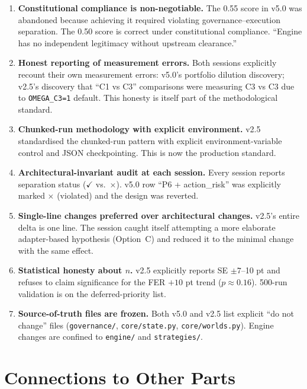\begin{enumerate}
\item \textbf{Constitutional compliance is non-negotiable.}
The 0.55 score in v5.0 was abandoned because achieving it required
violating governance--execution separation. The 0.50 score is
correct under constitutional compliance. ``Engine has no independent
legitimacy without upstream clearance.''

\item \textbf{Honest reporting of measurement errors.}
Both sessions explicitly recount their own measurement errors:
v5.0's portfolio dilution discovery; v2.5's discovery that ``C1 vs
C3'' comparisons were measuring C3 vs C3 due to
\texttt{OMEGA\_C3=1} default. This honesty is itself part of the
methodological standard.

\item \textbf{Chunked-run methodology with explicit environment.}
v2.5 standardised the chunked-run pattern with explicit
environment-variable control and JSON checkpointing. This is now
the production standard.

\item \textbf{Architectural-invariant audit at each session.}
Every session reports separation status ($\checkmark$ vs.~$\times$).
v5.0 row ``P6 + action\_risk'' was explicitly marked $\times$
(violated) and the design was reverted.

\item \textbf{Single-line changes preferred over architectural
changes.}
v2.5's entire delta is one line. The session caught itself
attempting a more elaborate adapter-based hypothesis (Option~C) and
reduced it to the minimal change with the same effect.

\item \textbf{Statistical honesty about $n$.}
v2.5 explicitly reports SE $\pm 7$--10 pt and refuses to claim
significance for the FER $+10$ pt trend ($p \approx 0.16$).
500-run validation is on the deferred-priority list.

\item \textbf{Source-of-truth files are frozen.}
Both v5.0 and v2.5 list explicit ``do not change'' files
(\texttt{governance/}, \texttt{core/state.py},
\texttt{core/worlds.py}). Engine changes are confined to
\texttt{engine/} and \texttt{strategies/}.
\end{enumerate}

\section*{Connections to Other Parts}

